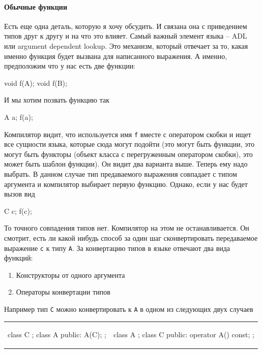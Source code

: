 \paragraph{Обычные функции}

Есть еще одна деталь, которую я хочу обсудить.
И связана она с приведением типов друг к другу и на что это влияет.
Самый важный элемент языка -- ADL или argument dependent lookup.
Это механизм, который отвечает за то, какая именно функция будет вызвана для написанного выражения.
А именно, предположим что у нас есть две функции:
\begin{cppcode}
void f(A);
void f(B);
\end{cppcode}
И мы хотим позвать функцию так
\begin{cppcode}
A a;
f(a);
\end{cppcode}
Компилятор видит, что используется имя \verb"f" вместе с оператором скобки и ищет все сущности языка, которые сюда могут подойти (это могут быть функции, это могут быть функторы (объект класса с перегруженным оператором скобки), это может быть шаблон функции).
Он видит два варианта выше.
Теперь ему надо выбрать.
В данном случае тип предаваемого выражения совпадает с типом аргумента и компилятор выбирает первую функцию.
Однако, если у нас будет вызов вид
\begin{cppcode}
C c;
f(c);
\end{cppcode}
То точного совпадения типов нет.
Компилятор на этом не останавливается.
Он смотрит, есть ли какой нибудь способ за один шаг сконвертировать передаваемое выражение \verb"c" к типу \verb"A".
За конвертацию типов в языке отвечают два вида функций:
\begin{enumerate}
\item Конструкторы от одного аргумента

\item Операторы конвертации типов
\end{enumerate}
Например тип \verb"C" можно конвертировать к \verb"A" в одном из следующих двух случаев
\begin{center}
\begin{tabular}{cc}
{
\begin{minipage}[\baselineskip]{5.5cm}
\begin{cppcode}[numbers = none]
class C {};
class A {
public:
  A(C);
};
\end{cppcode}
\end{minipage}
}&{
\begin{minipage}[\baselineskip]{5.5cm}
\begin{cppcode}[numbers = none]
class A {};
class C {
public:
  operator A() const;
};
\end{cppcode}
\end{minipage}
}
\end{tabular}
\end{center}

